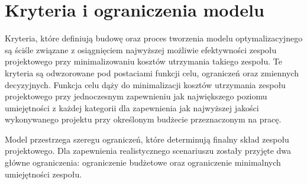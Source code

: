 \section{Kryteria i ograniczenia modelu}\label{sec:ograniczenia_modelu}
\par Kryteria, które definiują budowę oraz proces tworzenia modelu optymalizacyjnego są ściśle związane z osiągnięciem najwyższej możliwie efektywności zespołu projektowego przy minimalizowaniu kosztów utrzymania takiego zespołu. Te kryteria są odwzorowane pod postaciami funkcji celu, ograniczeń oraz zmiennych decyzyjnych. Funkcja celu dąży do minimalizacji kosztów utrzymania zespołu projektowego przy jednoczesnym zapewnieniu jak największego poziomu umiejętności z każdej kategorii dla zapewnienia jak najwyższej jakości wykonywanego projektu przy określonym budżecie przeznaczonym na pracę.
\par Model przestrzega szeregu ograniczeń, które determinują finalny skład zespołu projektowego. Dla zapewnienia realistycznego scenariuszu zostały przyjęte dwa główne ograniczenia: ograniczenie budżetowe oraz ograniczenie minimalnych umiejętności zespołu. 

